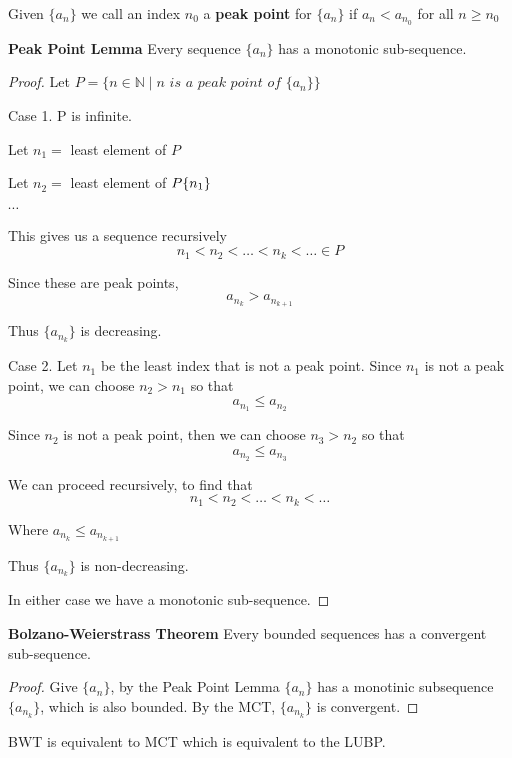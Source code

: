 \begin{defn}
Given $\{a_n\}$ we call an index $n_0$ a \textbf{peak point} for $\{a_n\}$ if $a_n < a_{n_0}$ for all $n\geq n_0$
\end{defn}

\begin{lem} \textbf{Peak Point Lemma}
Every sequence $\{a_n\}$ has a monotonic sub-sequence.
\end{lem}

\begin{proof}
Let $P = \{n \in\mathbb{N} \mid \textit{n is a peak point of } \{a_n\}\}$ 

Case 1. P is infinite.

Let $n_1 = $ least element of $P$

Let $n_2 = $ least element of $P \\ \{n_1\}$

$\cdots$

This gives us a sequence recursively
\[n_1<n_2<\dots < n_k < \dots \in P\]

Since these are peak points, 
\[a_{n_k} > a_{n_{k+1}}\]

Thus $\{a_{n_k}\}$ is decreasing.

Case 2. Let $n_1$ be the least index that is not a peak point. Since $n_1$ is not a peak point, we can choose $n_2>n_1$ so that $$a_{n_1}\leq a_{n_2}$$

Since $n_2$ is not a peak point, then we can choose $n_3>n_2$ so that $$a_{n_2}\leq a_{n_3}$$

We can proceed recursively, to find that 
\[
n_1 < n_2 < \dots < n_k < \dots
\]

Where $a_{n_k}\leq a_{n_{k+1}}$

Thus $\{a_{n_k}\}$ is non-decreasing.

In either case we have a monotonic sub-sequence.
\end{proof}


\begin{thm} \textbf{Bolzano-Weierstrass Theorem}
Every bounded sequences has a convergent sub-sequence.
\end{thm}

\begin{proof}
Give $\{a_n\}$, by the Peak Point Lemma $\{a_n\}$ has a monotinic subsequence $\{a_{n_k}\}$, which is also bounded. By the MCT, $\{a_{n_k}\}$ is convergent.
\end{proof}

\begin{note}
BWT is equivalent to MCT which is equivalent to the LUBP.
\end{note}



